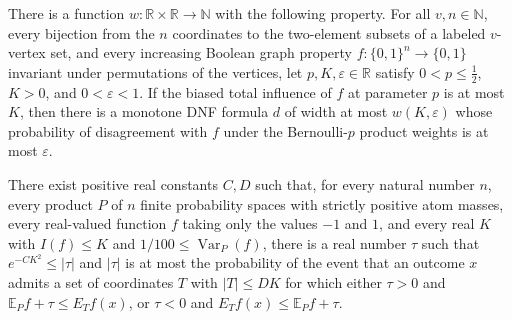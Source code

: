 \begin{theorem}
\leanok
{}
There is a function $w:\mathbb R\times\mathbb R\to\mathbb N$ with the following
property. For all $v,n\in\mathbb N$, every bijection from the $n$ coordinates to the
two-element subsets of a labeled $v$-vertex set, and every increasing Boolean graph
property $f:\{0,1\}^n\to\{0,1\}$ invariant under permutations of the vertices, let
$p,K,\varepsilon\in\mathbb R$ satisfy $0<p\le\tfrac12$, $K>0$, and $0<\varepsilon<1$. If
the biased total influence of $f$ at parameter $p$ is at most $K$, then there is a
monotone DNF formula $d$ of width at most $w(K,\varepsilon)$ whose probability of
disagreement with $f$ under the Bernoulli-$p$ product weights is at most $\varepsilon$.
\end{theorem}

\begin{theorem}
\leanok
{}
There exist positive real constants $C,D$ such that, for every natural number $n$, every
product $P$ of $n$ finite probability spaces with strictly positive atom masses, every
real-valued function $f$ taking only the values $-1$ and $1$, and every real $K$ with
$I(f)\leq K$ and $1/100\leq\operatorname{Var}_P(f)$, there is a real number $\tau$ such
that $e^{-CK^2}\leq|\tau|$ and $|\tau|$ is at most the probability of the event that an
outcome $x$ admits a set of coordinates $T$ with $|T|\leq DK$ for which either $\tau>0$
and $\mathbb E_P f+\tau\leq E_Tf(x)$, or $\tau<0$ and $E_Tf(x)\leq\mathbb E_P f+\tau$.
\end{theorem}

